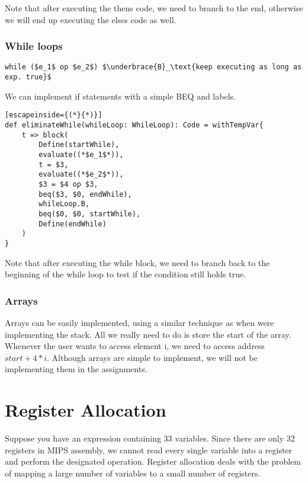 \documentclass[12pt, letterpaper]{article}
\begin{document}
Note that after executing the thens code, we need to branch to the end, otherwise we will end up executing the elses code as well.\\

\subsubsection{While loops}
\begin{lstlisting}[mathescape]
while ($e_1$ op $e_2$) $\underbrace{B}_\text{keep executing as long as exp. true}$
\end{lstlisting}

We can implement if statements with a simple BEQ and labels.\\

\begin{lstlisting}[escapeinside={(*}{*)}]
def eliminateWhile(whileLoop: WhileLoop): Code = withTempVar{
	t => block(
		Define(startWhile),
		evaluate((*$e_1$*)),
		t = $3,
		evaluate((*$e_2$*)),
		$3 = $4 op $3,
		beq($3, $0, endWhile),
		whileLoop.B,
		beq($0, $0, startWhile),
		Define(endWhile)
	)
}
\end{lstlisting}

Note that after executing the while block, we need to branch back to the beginning of the while loop to test if the condition still holds true.\\

\subsubsection{Arrays}
Arrays can be easily implemented, using a similar technique as when were implementing the stack. All we really need to do is store the start of the array. Whenever the user wants to access element i, we need to access address \(start + 4*i\). Although arrays are simple to implement, we will not be implementing them in the assignments.

\section{Register Allocation}
Suppose you have an expression containing 33 variables. Since there are only 32 registers in MIPS assembly, we cannot read every single variable into a register and perform the designated operation. Register allocation deals with the problem of mapping a large number of variables to a small number of registers.\\
\end{document}
